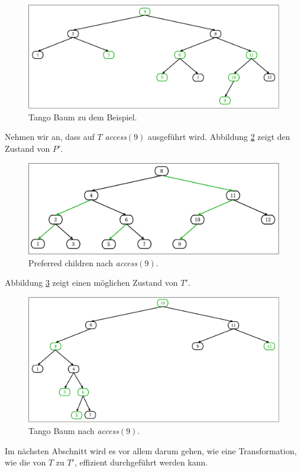 \documentclass[a4paper,12pt]{article}
\begin{document}
\begin{figure}[H]
	\centering
	\includegraphics[width=1\textwidth]{Medien/Tango/Tangobaum}
	\caption{Tango Baum zu dem Beispiel. }
	\label{fig:Tangobaum}
\end{figure}
\noindent Nehmen wir an, dass auf $T$ \textit{access}$\left(9\right)$ ausgeführt wird. Abbildung \ref{fig:prefChilds2} zeigt den Zustand von $P'$.

\begin{figure}[H]
	\centering
	\includegraphics[width=1\textwidth]{Medien/Tango/prefChilds2}
	\caption{Preferred children nach  \textit{access}$\left(9\right)$. }
	\label{fig:prefChilds2}
\end{figure}

\noindent Abbildung \ref{fig:Tangobaum2} zeigt einen möglichen Zustand von $T'$.
\begin{figure}[H]
	\centering
	\includegraphics[width=1\textwidth]{Medien/Tango/Tangobaum2}
	\caption{Tango Baum nach  \textit{access}$\left(9\right)$. }
	\label{fig:Tangobaum2}
\end{figure}
\noindent Im nächsten Abschnitt wird es vor allem darum gehen, wie eine Transformation, wie die von $T$ zu $T'$, effizient durchgeführt werden kann.
\end{document}
